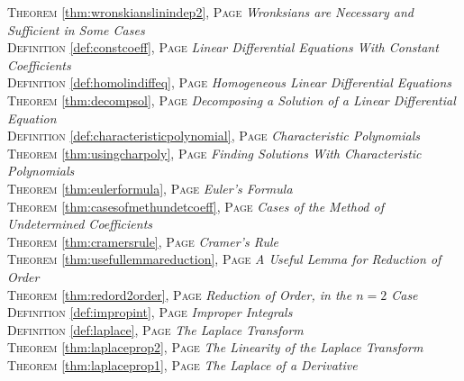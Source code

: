 \begin{multicols}{2}
{\textsc{Theorem} \ref{thm:wronskianslinindep2}, \textsc{Page} \pageref{thm:wronskianslinindep2} \textit{Wronksians are Necessary and Sufficient in Some Cases} \\
\textsc{Definition} \ref{def:constcoeff}, \textsc{Page} \pageref{def:constcoeff} \textit{Linear Differential Equations With Constant Coefficients} \\
\textsc{Definition} \ref{def:homolindiffeq}, \textsc{Page} \pageref{def:homolindiffeq} \textit{Homogeneous Linear Differential Equations} \\
\textsc{Theorem} \ref{thm:decompsol}, \textsc{Page} \pageref{thm:decompsol} \textit{Decomposing a Solution of a Linear Differential Equation} \\
\textsc{Definition} \ref{def:characteristicpolynomial}, \textsc{Page} \pageref{def:characteristicpolynomial} \textit{Characteristic Polynomials} \\
\textsc{Theorem} \ref{thm:usingcharpoly}, \textsc{Page} \pageref{thm:usingcharpoly} \textit{Finding Solutions With Characteristic Polynomials} \\
\textsc{Theorem} \ref{thm:eulerformula}, \textsc{Page} \pageref{thm:eulerformula} \textit{Euler's Formula} \\
\textsc{Theorem} \ref{thm:casesofmethundetcoeff}, \textsc{Page} \pageref{thm:casesofmethundetcoeff} \textit{Cases of the Method of Undetermined Coefficients} \\
\textsc{Theorem} \ref{thm:cramersrule}, \textsc{Page} \pageref{thm:cramersrule} \textit{Cramer's Rule} \\
\textsc{Theorem} \ref{thm:usefullemmareduction}, \textsc{Page} \pageref{thm:usefullemmareduction} \textit{A Useful Lemma for Reduction of Order} \\
\textsc{Theorem} \ref{thm:redord2order}, \textsc{Page} \pageref{thm:redord2order} \textit{Reduction of Order, in the \(n=2\) Case} \\
\textsc{Definition} \ref{def:impropint}, \textsc{Page} \pageref{def:impropint} \textit{Improper Integrals} \\
\textsc{Definition} \ref{def:laplace}, \textsc{Page} \pageref{def:laplace} \textit{The Laplace Transform} \\
\textsc{Theorem} \ref{thm:laplaceprop2}, \textsc{Page} \pageref{thm:laplaceprop2} \textit{The Linearity of the Laplace Transform} \\
\textsc{Theorem} \ref{thm:laplaceprop1}, \textsc{Page} \pageref{thm:laplaceprop1} \textit{The Laplace of a Derivative} \\
}
\end{multicols}
